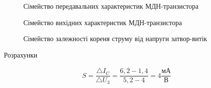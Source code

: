 \documentclass[a4paper,14pt]{extreport}
\begin{document}
\newpage
\clearpage
\begin{figure}[h]
\caption{Сімейство передавальних характеристик МДН-транзистора}
\label{ris1}
\end{figure}

\begin{figure}[h!]
\caption{Сімейство вихідних характеристик МДН-транзистора}
\label{ris1}
\end{figure}
\begin{figure}[h]
\caption{Сімейство залежності кореня струму від напруги затвор-витік}
\label{ris1}
\end{figure}
\newpage
  \begin{center}Розрахунки\end{center}
\begin{align}\label{q1}
  S = \dfrac{\triangle I_C}{\triangle U_{\text{3}}} = \dfrac{6,2-1,4}{5,2-4}=4 \dfrac{\text{мА}}{\text{В}}
\end{align}
\end{document}
